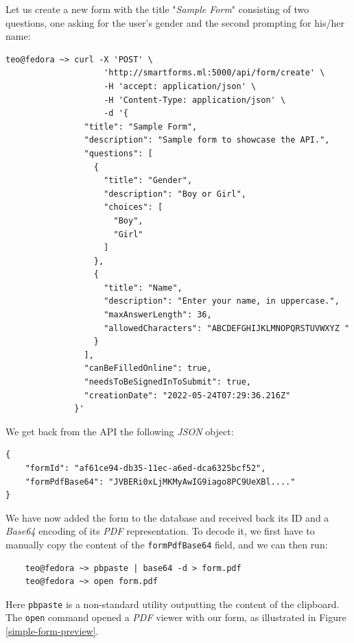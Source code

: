 \documentclass[11pt, a4paper]{report}
\def\code#1{\texttt{#1}}
\begin{document}
Let us create a new form with the title "\textit{Sample Form}" consisting of two questions, one asking for the user's gender and the second prompting for his/her name:

\begin{verbatim}
teo@fedora ~> curl -X 'POST' \
                    'http://smartforms.ml:5000/api/form/create' \
                    -H 'accept: application/json' \
                    -H 'Content-Type: application/json' \
                    -d '{
                "title": "Sample Form",
                "description": "Sample form to showcase the API.",
                "questions": [
                  {
                    "title": "Gender",
                    "description": "Boy or Girl",
                    "choices": [
                      "Boy",
                      "Girl"
                    ]
                  },
                  {
                    "title": "Name",
                    "description": "Enter your name, in uppercase.",
                    "maxAnswerLength": 36,
                    "allowedCharacters": "ABCDEFGHIJKLMNOPQRSTUVWXYZ "
                  }
                ],
                "canBeFilledOnline": true,
                "needsToBeSignedInToSubmit": true,
                "creationDate": "2022-05-24T07:29:36.216Z"
              }'
\end{verbatim}

We get back from the API the following \textit{JSON} object:
\begin{verbatim}
{
    "formId": "af61ce94-db35-11ec-a6ed-dca6325bcf52",
    "formPdfBase64": "JVBERi0xLjMKMyAwIG9iago8PC9UeXBl...."
}
\end{verbatim}

We have now added the form to the database and received back its ID and a \textit{Base64} encoding of its \textit{PDF} representation. To decode it, we first have to manually copy the content of the \code{formPdfBase64} field, and we can then run:

\begin{verbatim}
    teo@fedora ~> pbpaste | base64 -d > form.pdf
    teo@fedora ~> open form.pdf
\end{verbatim}

Here \code{pbpaste} is a non-standard utility outputting the content of the clipboard. The \code{open} command opened a \textit{PDF} viewer with our form, as illustrated in Figure \ref{simple-form-preview}.
\end{document}
